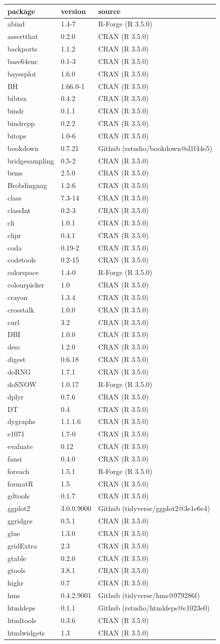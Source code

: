 \documentclass[12pt,a4paper,UTF8,twoside]{book}
\theoremstyle{definition}
\theoremstyle{definition}
\theoremstyle{definition}
\theoremstyle{remark}
\begin{document}
\begin{longtable}[]{@{}lll@{}}
\toprule
package & version & source\tabularnewline
\midrule
\endhead
abind & 1.4-7 & R-Forge (R 3.5.0)\tabularnewline
assertthat & 0.2.0 & CRAN (R 3.5.0)\tabularnewline
backports & 1.1.2 & CRAN (R 3.5.0)\tabularnewline
base64enc & 0.1-3 & CRAN (R 3.5.0)\tabularnewline
bayesplot & 1.6.0 & CRAN (R 3.5.0)\tabularnewline
BH & 1.66.0-1 & CRAN (R 3.5.0)\tabularnewline
bibtex & 0.4.2 & CRAN (R 3.5.0)\tabularnewline
bindr & 0.1.1 & CRAN (R 3.5.0)\tabularnewline
bindrcpp & 0.2.2 & CRAN (R 3.5.0)\tabularnewline
bitops & 1.0-6 & CRAN (R 3.5.0)\tabularnewline
bookdown & 0.7.21 & Github (rstudio/bookdown@d1f44e5)\tabularnewline
bridgesampling & 0.5-2 & CRAN (R 3.5.0)\tabularnewline
brms & 2.5.0 & CRAN (R 3.5.0)\tabularnewline
Brobdingnag & 1.2-6 & CRAN (R 3.5.0)\tabularnewline
class & 7.3-14 & CRAN (R 3.5.0)\tabularnewline
classInt & 0.2-3 & CRAN (R 3.5.0)\tabularnewline
cli & 1.0.1 & CRAN (R 3.5.0)\tabularnewline
clipr & 0.4.1 & CRAN (R 3.5.0)\tabularnewline
coda & 0.19-2 & CRAN (R 3.5.0)\tabularnewline
codetools & 0.2-15 & CRAN (R 3.5.0)\tabularnewline
colorspace & 1.4-0 & R-Forge (R 3.5.0)\tabularnewline
colourpicker & 1.0 & CRAN (R 3.5.0)\tabularnewline
crayon & 1.3.4 & CRAN (R 3.5.0)\tabularnewline
crosstalk & 1.0.0 & CRAN (R 3.5.0)\tabularnewline
curl & 3.2 & CRAN (R 3.5.0)\tabularnewline
DBI & 1.0.0 & CRAN (R 3.5.0)\tabularnewline
desc & 1.2.0 & CRAN (R 3.5.0)\tabularnewline
digest & 0.6.18 & CRAN (R 3.5.0)\tabularnewline
doRNG & 1.7.1 & CRAN (R 3.5.0)\tabularnewline
doSNOW & 1.0.17 & R-Forge (R 3.5.0)\tabularnewline
dplyr & 0.7.6 & CRAN (R 3.5.0)\tabularnewline
DT & 0.4 & CRAN (R 3.5.0)\tabularnewline
dygraphs & 1.1.1.6 & CRAN (R 3.5.0)\tabularnewline
e1071 & 1.7-0 & CRAN (R 3.5.0)\tabularnewline
evaluate & 0.12 & CRAN (R 3.5.0)\tabularnewline
fansi & 0.4.0 & CRAN (R 3.5.0)\tabularnewline
foreach & 1.5.1 & R-Forge (R 3.5.0)\tabularnewline
formatR & 1.5 & CRAN (R 3.5.0)\tabularnewline
gdtools & 0.1.7 & CRAN (R 3.5.0)\tabularnewline
ggplot2 & 3.0.0.9000 & Github (tidyverse/ggplot2@3e1e6e4)\tabularnewline
ggridges & 0.5.1 & CRAN (R 3.5.0)\tabularnewline
glue & 1.3.0 & CRAN (R 3.5.0)\tabularnewline
gridExtra & 2.3 & CRAN (R 3.5.0)\tabularnewline
gtable & 0.2.0 & CRAN (R 3.5.0)\tabularnewline
gtools & 3.8.1 & CRAN (R 3.5.0)\tabularnewline
highr & 0.7 & CRAN (R 3.5.0)\tabularnewline
hms & 0.4.2.9001 & Github (tidyverse/hms@979286f)\tabularnewline
htmldeps & 0.1.1 & Github (rstudio/htmldeps@c1023e0)\tabularnewline
htmltools & 0.3.6 & CRAN (R 3.5.0)\tabularnewline
htmlwidgets & 1.3 & CRAN (R 3.5.0)\tabularnewline

\end{longtable}
\end{document}
